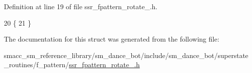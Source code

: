 Definition at line 19 of file ssr\+\_\+fpattern\+\_\+rotate\+\_.\+h.


\begin{DoxyCode}
20   \{
21   \}
\end{DoxyCode}


The documentation for this struct was generated from the following file\+:\begin{DoxyCompactItemize}
\item 
smacc\+\_\+sm\+\_\+reference\+\_\+library/sm\+\_\+dance\+\_\+bot/include/sm\+\_\+dance\+\_\+bot/superstate\+\_\+routines/f\+\_\+pattern/\hyperlink{ssr__fpattern__rotate__2_8h}{ssr\+\_\+fpattern\+\_\+rotate\+\_.\+h}\end{DoxyCompactItemize}
